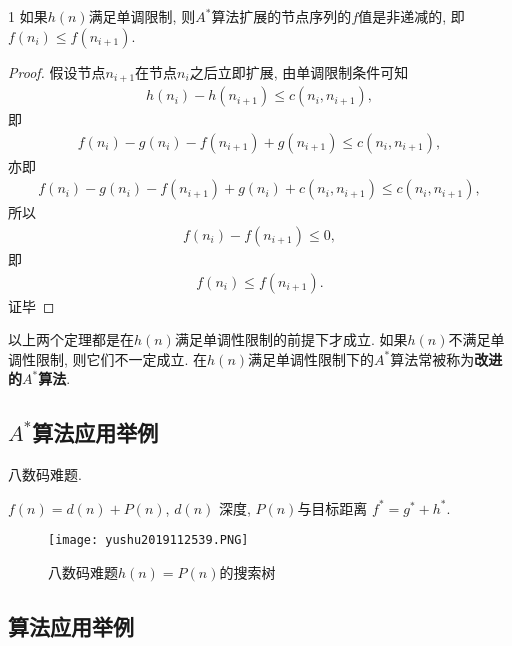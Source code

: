 \begin{mythm}{}{1}
如果$h(n)$满足单调限制, 则$A^*$算法扩展的节点序列的$f$值是非递减的, 即$f(n_i)\leq f(n_{i+1} )$.
\end{mythm}
\begin{proof}
假设节点$n_{i+1}$在节点$n_i$之后立即扩展, 由单调限制条件可知
\begin{align}
    h(n_i)-h(n_{i+1} )\leq c(n_i , n_{i+1}),
\end{align}
即
\begin{align}
    f(n_i)-g(n_i )-f(n_{i+1} )+g(n_{i+1} )\leq c(n_i , n_{i+1} ),
\end{align}
亦即
\begin{align}
    f(n_i)-g(n_i )-f(n_{i+1} )+g(n_i )+c(n_i , n_{i+1} )\leq c(n_i , n_{i+1} ),
\end{align}
所以
\begin{align}
    f(n_i)-f(n_{i+1} )\leq 0,
\end{align}
即
\begin{align}
    f(n_i)\leq f(n_{i+1}).
\end{align}
证毕
\end{proof}
\begin{remark}
  以上两个定理都是在$h(n)$满足单调性限制的前提下才成立. 如果$h(n)$不满足单调性限制, 则它们不一定成立.
  在$h(n)$满足单调性限制下的$A^*$算法常被称为\textbf{改进的$A^*$算法}.
\end{remark}
\subsection{$A^*$算法应用举例}
\begin{example}
  八数码难题.
\end{example}
$f(n)=d(n)+P(n)$, $d(n)$ 深度, $P(n)$与目标距离 $f^*=g^*+h^*$.
\begin{figure}[H]
\centering
\texttt{[image: yushu2019112539.PNG]}
\caption{八数码难题$h(n)=P(n)$的搜索树}
\label{AI32fig39}
\end{figure}
\subsection{算法应用举例}
